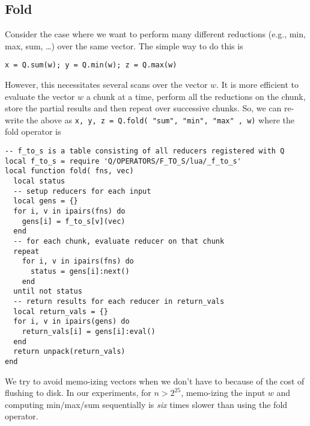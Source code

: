 \subsection{Fold}
\label{fold}
Consider the case where we want to perform many different reductions (e.g., min,
max, sum, \ldots) over the same vector. The simple way to do this is
\begin{verbatim}
x = Q.sum(w); y = Q.min(w); z = Q.max(w)
\end{verbatim}
However, this necessitates several scans over the vector \(w\). It is more
efficient to evaluate the vector \(w\) a chunk at a time, perform all the
reductions on the chunk, store the partial results and then repeat over
successive chunks. So, we can re-write the above as 
{\tt x, y, z = Q.fold({ "sum", "min", "max" }, w)}
where the fold operator is 
\begin{verbatim}
-- f_to_s is a table consisting of all reducers registered with Q
local f_to_s = require 'Q/OPERATORS/F_TO_S/lua/_f_to_s'
local function fold( fns, vec)
  local status
  -- setup reducers for each input 
  local gens = {} 
  for i, v in ipairs(fns) do 
    gens[i] = f_to_s[v](vec) 
  end
  -- for each chunk, evaluate reducer on that chunk
  repeat 
    for i, v in ipairs(fns) do 
      status = gens[i]:next() 
    end 
  until not status
  -- return results for each reducer in return_vals
  local return_vals = {}
  for i, v in ipairs(gens) do 
    return_vals[i] = gens[i]:eval() 
  end
  return unpack(return_vals)
end
\end{verbatim}
We try to avoid memo-izing vectors when we don't have to because 
of the cost of flushing to disk. In our experiments, for \(n > 2^{25}\), 
memo-izing the input \(w\) and computing min/max/sum sequentially 
is {\em six} times slower than using the fold operator.
